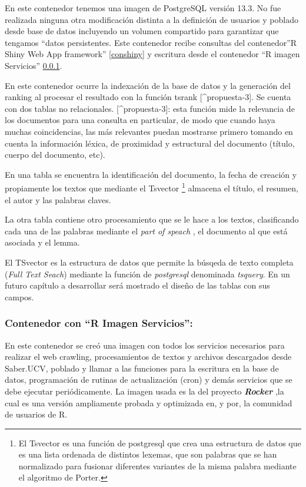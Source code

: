 \documentclass[
  10,
  openany]{book}
\begin{document}
En este contenedor tenemos una imagen de PostgreSQL versión 13.3. No fue realizada ninguna otra modificación distinta a la definición de usuarios y poblado desde base de datos incluyendo un volumen compartido para garantizar que tengamos ``datos persistentes. Este contenedor recibe consultas del contenedor''R Shiny Web App framework'' \ref{conshiny} y escritura desde el contenedor ``R imagen Servicios'' \ref{conservicios}.

En este contenedor ocurre la indexación de la base de datos y la generación del ranking al procesar el resultado con la función tsrank {[}\^{}propuesta-3{]}. Se cuenta con dos tablas no relacionales.
{[}\^{}propuesta-3{]}: esta función mide la relevancia de los documentos para una consulta en particular, de modo que cuando haya muchas coincidencias, las más relevantes puedan mostrarse primero tomando en cuenta la información léxica, de proximidad y estructural del documento (título, cuerpo del documento, etc).

En una tabla se encuentra la identificación del documento, la fecha de creación y propiamente los textos que mediante el Tsvector \footnote{El Tsvector es una función de postgresql que crea una estructura de datos que es una lista ordenada de distintos lexemas, que son palabras que se han normalizado para fusionar diferentes variantes de la misma palabra mediante el algoritmo de Porter.} almacena el título, el resumen, el autor y las palabras claves.

La otra tabla contiene otro procesamiento que se le hace a los textos, clasificando cada una de las palabras mediante el \emph{part of speach} , el documento al que está asociada y el lemma.

El TSvector es la estructura de datos que permite la búsqeda de texto completa (\emph{Full Text Seach}) mediante la función de \emph{postgresql} denominada \emph{tsquery}. En un futuro capítulo a desarrollar será mostrado el diseño de las tablas con sus campos.

\hypertarget{conservicios}{%
\subsubsection{Contenedor con ``R Imagen Servicios'':}\label{conservicios}}

En este contenedor se creó una imagen con todos los servicios necesarios para realizar el web crawling, procesamientos de textos y archivos descargados desde Saber.UCV, poblado y llamar a las funciones para la escritura en la base de datos, programación de rutinas de actualización (cron) y demás servicios que se debe ejecutar periódicamente. La imagen usada es la del proyecto \textbf{\emph{Rocker}} \citep{RJ-2017-065:2017} ,la cual es una versión ampliamente probada y optimizada en, y por, la comunidad de usuarios de R.
\end{document}
